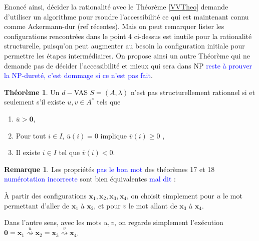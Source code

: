 \documentclass[a4paper,final]{article}
\theoremstyle{definition}
\newtheorem{Theorem}{Théorème}
\newtheorem*{Remark}{Remarque}
\let\geq\geqslant
\newcommand{\alain}[1]{\textcolor{blue}{#1}}
\newcommand{\transZ}[1]{\ensuremath{\stackrel{#1}{\rightsquigarrow}}}
\newcommand{\vect}[1]{\ensuremath{\mathbf{#1}}}
\newcommand{\valeur}[1]{\ensuremath{\overline{#1}}}
\begin{document}
Enoncé ainsi, décider la rationalité avec le Théorème \ref{VVTheo} demande d'utiliser un algorithme pour rsoudre l'accessibilité ce qui est maintenant connu comme Ackermann-dur (ref récentes). Mais on peut remarquer lister les configurations rencontrées dans le point 4 ci-dessus est inutile pour la rationalité structurelle, puisqu'on peut augmenter au besoin la configuration initiale  pour permettre les étapes intermédiaires.
On propose ainsi un autre Théorème  qui ne demande pas de décider l'accessibilité et mieux qui sera dans NP \alain{reste à prouver la NP-dureté, c'est dommage si ce n'est pas fait}.


\begin{Theorem}\label{conf_struct_rat}
Un $d-$VAS $S=(A,\lambda)$ n'est pas structurellement rationnel si et seulement s'il existe $u,v\in A^*$ tels que 
\begin{enumerate}
    \item $\valeur{u} > \vect{0}$,
    \item Pour tout $i \in I$, $\valeur{u}(i)=0$ implique $\valeur{v}(i) \geq 0$ ,
    \item Il existe $i\in I$ tel que $\valeur{v}(i) < 0$.
\end{enumerate}
\end{Theorem}

\begin{Remark}
Les propriétés \alain{pas le bon mot} des théorèmes 17 et 18 \alain{numérotation incorrecte} sont bien équivalentes \alain{mal dit} :

\noindent À partir des configurations $\vect{x}_1, \vect{x}_2, \vect{x}_3, \vect{x}_4$, on choisit simplement pour $u$ le mot permettant d'aller de $\vect{x}_1$ à $\vect{x}_2$, et pour $v$ le mot allant de $\vect{x}_3$ à $\vect{x}_4$.

\noindent Dans l'autre sens, avec les mots $u,v$, on regarde simplement l'exécution $\vect{0} = \vect{x}_1 \transZ{u} \vect{x}_2 = \vect{x}_3 \transZ{v} \vect{x}_4$.
\end{Remark}
\end{document}
